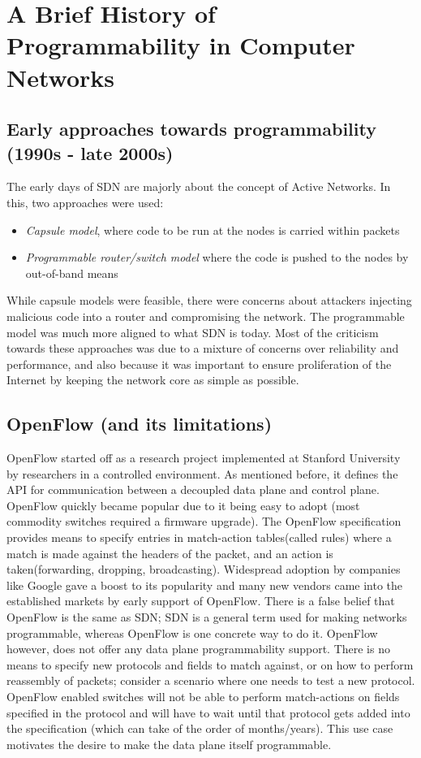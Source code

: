 \section{A Brief History of Programmability in Computer Networks}
\subsection{Early approaches towards programmability (1990s - late 2000s)}
The early days of SDN are majorly about the concept of Active Networks. In this, two approaches were used:
\begin{itemize}
  \item \textit{Capsule model}, where code to be run at the nodes is carried within packets
  \item \textit{Programmable router/switch model} where the code is pushed to the nodes by out-of-band means 
\end{itemize}

While capsule models were feasible, there were concerns about attackers injecting malicious code into a router and compromising
the network. The programmable model was much more aligned to what SDN is today. Most of the criticism towards these approaches 
was due to a mixture of concerns over reliability and performance, and also because it was important to ensure proliferation
of the Internet by keeping the network core as simple as possible.
\subsection{OpenFlow (and its limitations)}
OpenFlow started off as a research project implemented at Stanford University by researchers in a controlled environment. As 
mentioned before, it defines the API for communication between a decoupled data plane and control plane. OpenFlow quickly became
popular due to it being easy to adopt (most commodity switches required a firmware upgrade). The OpenFlow specification provides 
means to specify entries in match-action tables(called rules) where a match is made against the headers of the packet, and an
action is taken(forwarding, dropping, broadcasting). Widespread adoption by companies like Google gave a boost to its popularity
and many new vendors came into the established markets by early support of OpenFlow.
\newline
There is a false belief that OpenFlow is the same as SDN; SDN is a general term used for making networks programmable, whereas
OpenFlow is one concrete way to do it.
\newline
OpenFlow however, does not offer any data plane programmability support. There is no means to specify new protocols and fields to 
match against, or on how to perform reassembly of packets; consider a scenario where one needs to test a new protocol. OpenFlow
enabled switches will not be able to perform match-actions on fields specified in the protocol and will have to wait until that
protocol gets added into the specification (which can take of the order of months/years). This use case motivates the desire to make the
data plane itself programmable.
